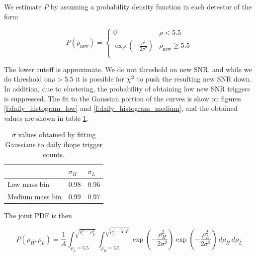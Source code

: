 %
%
%
%


We estimate $P$ by assuming a probability density function in each
detector of the form

\begin{equation}
P(\rho_\textrm{new}) = \left\{
  \begin{array}{lr}
    0  & \rho < 5.5 \\
    \exp\left(-\frac{\rho^2}{2\sigma^2}\right) & \rho_\textrm{new} \geq 5.5 \\
  \end{array} \right.
\end{equation}

The lower cutoff is approximate.  We do not threshold on new SNR, and
while we do threshold on$\rho > 5.5$ it is possible for $\chi^2$ to
push the resulting new SNR down.  In addition, due to clustering, the
probability of obtaining low new SNR triggers is suppressed.  The fit
to the Gaussian portion of the curves is show on  figures
\ref{f:daily_histogram_low} and \ref{f:daily_histogram_medium}, and
the obtained values are shown in table \ref{tab:daily_ihope_sigmas}.

\begin{table}
\begin{center}
\begin{tabular}{l | l l}
   & $\sigma_H$ & $\sigma_L$ \\
\hline
Low mass bin    & 0.98 & 0.96 \\
Medium mass bin & 0.99 & 0.97 \\
\end{tabular}
\end{center}
  \caption[Fit values for SNR histograms]{
  \label{tab:daily_ihope_sigmas}
$\sigma$ values obtained by fitting Gaussians to daily
ihope trigger counts.}
\end{table}

The joint PDF is then

\begin{equation}
P(\rho_H,\rho_L) = \frac{1}{A}
\int_{\rho_L = 5.5}^{\sqrt{\rho_i^2 - \rho_L^2}}
\int_{\rho_H = 5.5}^{\sqrt{\rho_i^2 - 5.5^2}}
\exp\left(-\frac{\rho_H^2}{2\sigma^2}\right)
\exp\left(-\frac{\rho_L^2}{2\sigma^2}\right)
\,d\rho_H
\,d\rho_L
\end{equation}

